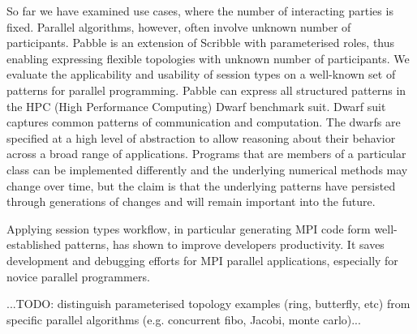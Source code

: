 
So far we have examined use cases, where the number of interacting parties is fixed. Parallel algorithms, however, often involve unknown number of participants.
Pabble is an extension of Scribble with parameterised roles, thus enabling expressing flexible topologies with unknown number of participants. We evaluate the applicability and usability of session types on a well-known set of patterns for parallel programming. Pabble can express all structured patterns in the HPC (High Performance Computing) Dwarf benchmark suit. Dwarf suit captures common patterns of communication and computation. %
The dwarfs are specified at a high level of abstraction to allow reasoning about their behavior across a broad range of applications. Programs that are members of a particular class can be implemented differently and the underlying numerical methods may change over time, but the claim is that the underlying patterns have persisted through generations of changes and will remain important into the future.

Applying session types workflow, in particular generating MPI code form well-established patterns, has shown to improve developers productivity. It saves development and debugging efforts for MPI parallel applications, especially for novice parallel programmers.

...TODO: distinguish parameterised topology examples (ring, butterfly, etc) from specific parallel algorithms (e.g. concurrent fibo, Jacobi, monte carlo)...

